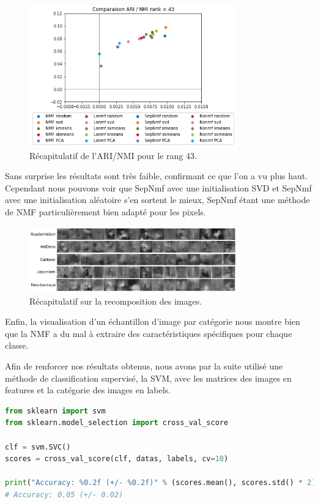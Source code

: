 \documentclass[runningheads]{llncs}
\begin{document}
\begin{figure}[H]
\centering
\includegraphics[width=0.8\textwidth]{ari_nmi_rank43.png}
\caption{Récapitulatif de l'ARI/NMI pour le rang 43.}
  \label{fig:k_sk-means43}
\end{figure}

Sans surprise les résultats sont très faible, confirmant ce que l'on a vu plus haut. Cependant nous pouvons voir que SepNmf avec une initialisation SVD et SepNmf avec une initialisation aléatoire s'en sortent le mieux, SepNmf étant une méthode de NMF particulièrement bien adapté pour les pixels. 

\begin{figure}[H]
\centering
\includegraphics[width=0.8\textwidth]{recomposition.png}
\caption{Récapitulatif sur la recomposition des images.}
  \label{fig:recomposition}
\end{figure}

\par\bigskip 
\noindent

Enfin, la visualisation d'un échantillon d'image par catégorie nous montre bien que la NMF a du mal à extraire des caractéristiques spécifiques pour chaque classe.

Afin de renforcer nos résultats obtenus, nous avons par la suite utilisé une méthode de classification supervisé, la SVM, avec les matrices des images en features et la catégorie des images en labels.
\newpage


\begin{lstlisting}[language=Python]
from sklearn import svm
from sklearn.model_selection import cross_val_score

clf = svm.SVC()
scores = cross_val_score(clf, datas, labels, cv=10)

print("Accuracy: %0.2f (+/- %0.2f)" % (scores.mean(), scores.std() * 2))
# Accuracy: 0.05 (+/- 0.02) 
\end{lstlisting}
\end{document}
